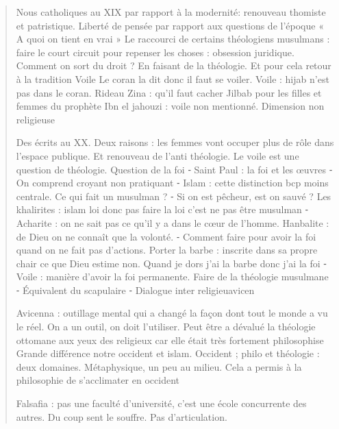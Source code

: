 \begin{quote}
Nous catholiques au XIX par rapport à la modernité: renouveau thomiste et patristique. Liberté de pensée par rapport aux questions de l’époque
« A quoi on tient en vrai »
Le raccourci de certains théologiens musulmans : faire le court circuit pour repenser les choses : obsession juridique. Comment on sort du droit ? En faisant de la théologie. Et pour cela retour à la tradition
Voile
Le coran la dit donc il faut se voiler. Voile : hijab n’est pas dans le coran. Rideau
Zina : qu’il faut cacher
Jilbab pour les filles et femmes du prophète 
Ibn el jahouzi : voile non mentionné. Dimension non religieuse

Des écrits au XX. Deux raisons : les femmes vont occuper plus de rôle dans l’espace publique.
Et renouveau de l’anti théologie. Le voile est une question de théologie. Question de la foi
	⁃	Saint Paul : la foi et les œuvres
	⁃	On comprend croyant non pratiquant
	⁃	Islam : cette distinction bcp moins centrale. Ce qui fait un musulman ? 
	⁃	Si on est pêcheur, est on sauvé ? Les khalirites : islam loi donc pas faire la loi c’est ne pas être musulman
	⁃	Acharite : on ne sait pas ce qu’il y a dans le cœur de l’homme. Hanbalite : de Dieu on ne connaît que la volonté.
	⁃	Comment faire pour avoir la foi quand on ne fait pas d’actions. Porter la barbe : inscrite dans sa propre chair ce que Dieu estime non. Quand je dors j’ai la barbe donc j’ai la foi
	⁃	Voile : manière d’avoir la foi permanente. Faire de la théologie musulmane
	⁃	Équivalent du scapulaire
	⁃	Dialogue inter religieuavicen


Avicenna : outillage mental qui a changé la façon dont tout le monde a vu le réel. On a un outil, on doit l’utiliser. Peut être a dévalué la théologie ottomane aux yeux des religieux car elle était très fortement philosophise
Grande différence notre occident et islam. Occident ; philo et théologie : deux domaines. Métaphysique, un peu au milieu. Cela a permis à la philosophie de s’acclimater en occident

Falsafia : pas une faculté d’université, c’est une école concurrente des autres. Du coup sent le souffre. Pas d’articulation.

\end{quote}